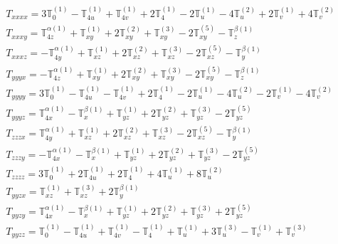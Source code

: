 \documentclass[fleqn,8pt,landscape]{jsarticle}
\begin{document}
\begin{align*}
& T_{xxxx} = 3 \mathbb{T}_{0}^{(1)} - \mathbb{T}_{4u}^{(1)} + \mathbb{T}_{4v}^{(1)} + 2 \mathbb{T}_{4}^{(1)} - 2 \mathbb{T}_{u}^{(1)} - 4 \mathbb{T}_{u}^{(2)} + 2 \mathbb{T}_{v}^{(1)} + 4 \mathbb{T}_{v}^{(2)} \\
& T_{xxxy} = \mathbb{T}_{4z}^{\alpha(1)} + \mathbb{T}_{xy}^{(1)} + 2 \mathbb{T}_{xy}^{(2)} + \mathbb{T}_{xy}^{(3)} - 2 \mathbb{T}_{xy}^{(5)} - \mathbb{T}_{z}^{\beta(1)} \\
& T_{xxxz} = - \mathbb{T}_{4y}^{\alpha(1)} + \mathbb{T}_{xz}^{(1)} + 2 \mathbb{T}_{xz}^{(2)} + \mathbb{T}_{xz}^{(3)} - 2 \mathbb{T}_{xz}^{(5)} - \mathbb{T}_{y}^{\beta(1)} \\
& T_{yyyx} = - \mathbb{T}_{4z}^{\alpha(1)} + \mathbb{T}_{xy}^{(1)} + 2 \mathbb{T}_{xy}^{(2)} + \mathbb{T}_{xy}^{(3)} - 2 \mathbb{T}_{xy}^{(5)} - \mathbb{T}_{z}^{\beta(1)} \\
& T_{yyyy} = 3 \mathbb{T}_{0}^{(1)} - \mathbb{T}_{4u}^{(1)} - \mathbb{T}_{4v}^{(1)} + 2 \mathbb{T}_{4}^{(1)} - 2 \mathbb{T}_{u}^{(1)} - 4 \mathbb{T}_{u}^{(2)} - 2 \mathbb{T}_{v}^{(1)} - 4 \mathbb{T}_{v}^{(2)} \\
& T_{yyyz} = \mathbb{T}_{4x}^{\alpha(1)} - \mathbb{T}_{x}^{\beta(1)} + \mathbb{T}_{yz}^{(1)} + 2 \mathbb{T}_{yz}^{(2)} + \mathbb{T}_{yz}^{(3)} - 2 \mathbb{T}_{yz}^{(5)} \\
& T_{zzzx} = \mathbb{T}_{4y}^{\alpha(1)} + \mathbb{T}_{xz}^{(1)} + 2 \mathbb{T}_{xz}^{(2)} + \mathbb{T}_{xz}^{(3)} - 2 \mathbb{T}_{xz}^{(5)} - \mathbb{T}_{y}^{\beta(1)} \\
& T_{zzzy} = - \mathbb{T}_{4x}^{\alpha(1)} - \mathbb{T}_{x}^{\beta(1)} + \mathbb{T}_{yz}^{(1)} + 2 \mathbb{T}_{yz}^{(2)} + \mathbb{T}_{yz}^{(3)} - 2 \mathbb{T}_{yz}^{(5)} \\
& T_{zzzz} = 3 \mathbb{T}_{0}^{(1)} + 2 \mathbb{T}_{4u}^{(1)} + 2 \mathbb{T}_{4}^{(1)} + 4 \mathbb{T}_{u}^{(1)} + 8 \mathbb{T}_{u}^{(2)} \\
& T_{yyzx} = \mathbb{T}_{xz}^{(1)} + \mathbb{T}_{xz}^{(3)} + 2 \mathbb{T}_{y}^{\beta(1)} \\
& T_{yyzy} = \mathbb{T}_{4x}^{\alpha(1)} - \mathbb{T}_{x}^{\beta(1)} + \mathbb{T}_{yz}^{(1)} + 2 \mathbb{T}_{yz}^{(2)} + \mathbb{T}_{yz}^{(3)} + 2 \mathbb{T}_{yz}^{(5)} \\
& T_{yyzz} = \mathbb{T}_{0}^{(1)} - \mathbb{T}_{4u}^{(1)} + \mathbb{T}_{4v}^{(1)} - \mathbb{T}_{4}^{(1)} + \mathbb{T}_{u}^{(1)} + 3 \mathbb{T}_{u}^{(3)} - \mathbb{T}_{v}^{(1)} + \mathbb{T}_{v}^{(3)} \\

\end{align*}
\end{document}
